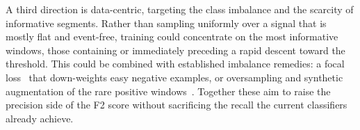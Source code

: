 A third direction is data-centric, targeting the class imbalance and the scarcity of informative segments. Rather than sampling uniformly over a signal that is mostly flat and event-free, training could concentrate on the most informative windows, those containing or immediately preceding a rapid descent toward the threshold. This could be combined with established imbalance remedies: a focal loss~\citep{lin2017focal} that down-weights easy negative examples, or oversampling and synthetic augmentation of the rare positive windows~\citep{chawla2002smote}. Together these aim to raise the precision side of the F2 score without sacrificing the recall the current classifiers already achieve.
